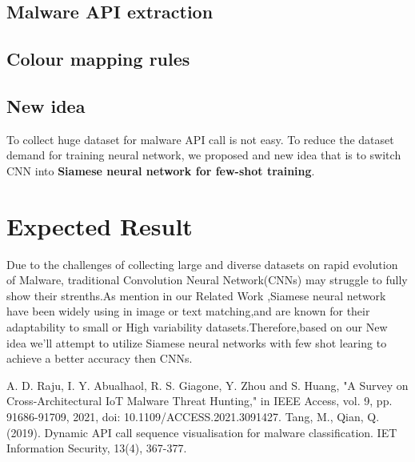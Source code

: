 \documentclass{article}
\begin{document}
\subsection{Malware API extraction}
\subsection{Colour mapping rules}
\subsection{New idea}
To collect huge dataset for malware API call is not easy. To reduce the dataset demand for training neural network, 
we proposed and new idea that is to switch CNN into \textbf{Siamese neural network for few-shot training}.



\section{Expected Result}
Due to the challenges of collecting large and diverse datasets on rapid evolution of Malware, traditional Convolution Neural Network(CNNs) may struggle to fully show their strenths.As mention in our Related Work ,Siamese neural network have been widely using in image or text matching,and are known for their adaptability to small or High variability datasets.Therefore,based on our New idea we'll attempt to utilize Siamese neural networks with few shot learing to achieve a better accuracy then CNNs.


\begin{thebibliography}{99}
     A. D. Raju, I. Y. Abualhaol, R. S. Giagone, Y. Zhou and S. Huang, "A Survey on Cross-Architectural IoT Malware Threat Hunting," in IEEE Access, vol. 9, pp. 91686-91709, 2021, doi: 10.1109/ACCESS.2021.3091427.
     Tang, M., Qian, Q. (2019). Dynamic API call sequence visualisation for malware classification. IET Information Security, 13(4), 367-377.  
\end{thebibliography}
\end{document}
